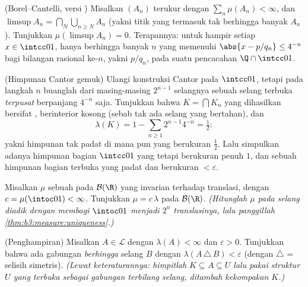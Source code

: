 \begin{exercise}[$\star\star$]\label{exo:b3:measure:4}
(Borel--Cantelli, versi ) Misalkan $(A_n)$ terukur
dengan $\sum_n\mu(A_n) < \infty$, dan $\limsup A_n =
\bigcap_N\bigcup_{n\geq N}A_n$ (yakni titik yang termasuk
tak berhingga banyak $A_n$). Tunjukkan $\mu(\limsup A_n) = 0$.
Terapannya: untuk hampir setiap $x \in \intcc01$, hanya berhingga
banyak $n$ yang memenuhi $\abs{x - p/q_n} \leq 4^{-n}$ bagi
bilangan rasional ke-$n$, yakni $p/q_n$, pada suatu pencacahan
$\Q\cap\intcc01$.
\end{exercise}

\begin{exercise}[$\star\star$]\label{exo:b3:measure:5}
(Himpunan Cantor gemuk) Ulangi konstruksi Cantor pada $\intcc01$,
tetapi pada langkah $n$ buanglah dari masing-masing $2^{n-1}$ selangnya sebuah
selang terbuka \emph{terpusat} berpanjang $4^{-n}$ saja. Tunjukkan
bahwa $K = \bigcap K_n$ yang dihasilkan bersifat , berinterior
kosong (sebab tak ada selang yang bertahan), dan
\[
\lambda(K) = 1 - \sum_{n\geq1}2^{n-1}4^{-n} = \tfrac12 :
\]
yakni himpunan tak padat di mana pun yang berukuran $\frac12$. Lalu simpulkan adanya
himpunan bagian $\intcc01$ yang \emph{} tetapi berukuran penuh $1$, dan sebuah
himpunan bagian terbuka yang padat dan berukuran $< \varepsilon$.
\end{exercise}

\begin{exercise}[$\star\star$]\label{exo:b3:measure:6}
Misalkan $\mu$ sebuah  pada $\mathcal B(\R)$ yang invarian terhadap
translasi, dengan $c = \mu(\intoc01) < \infty$. Tunjukkan $\mu =
c\,\lambda$ pada $\mathcal B(\R)$. \emph{(Hitunglah $\mu$ pada selang diadik dengan membagi
$\intoc01$ menjadi $2^n$ translasinya, lalu panggillah
\cref{thm:b3:measure:uniqueness}.)}
\end{exercise}

\begin{exercise}[$\star\star$]\label{exo:b3:measure:7}
(Penghampiran) Misalkan $A \in \mathcal L$ dengan $\lambda(A) <
\infty$ dan $\varepsilon > 0$. Tunjukkan bahwa ada gabungan
\emph{berhingga} selang $B$ dengan $\lambda(A\,\triangle\,B) <
\varepsilon$ (dengan $\triangle$ = selisih simetris).
\emph{(Lewat keteraturannya: himpitlah $K \subseteq A \subseteq U$ lalu pakai
struktur $U$ yang terbuka sebagai gabungan terbilang
selang, ditambah kekompakan $K$.)}
\end{exercise}

